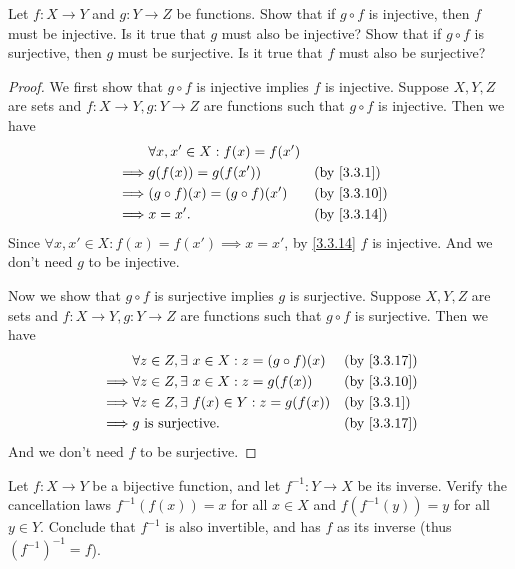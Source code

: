 \begin{ex}\label{ex:3.3.5}
  Let \(f : X \to Y\) and \(g : Y \to Z\) be functions.
  Show that if \(g \circ f\) is injective, then \(f\) must be injective.
  Is it true that \(g\) must also be injective?
  Show that if \(g \circ f\) is surjective, then \(g\) must be surjective.
  Is it true that \(f\) must also be surjective?
\end{ex}

\begin{proof}
  We first show that \(g \circ f\) is injective implies \(f\) is injective.
  Suppose \(X, Y, Z\) are sets and \(f : X \to Y, g : Y \to Z\) are functions such that \(g \circ f\) is injective.
  Then we have
  \begin{align*}
             & \forall x, x' \in X : f(x) = f(x')                                \\
    \implies & g(f(x)) = g(f(x'))                 &  & \by{3.3.1}                \\
    \implies & (g \circ f)(x) = (g \circ f)(x')   &  & \text{(by \cref{3.3.10})} \\
    \implies & x = x'.                            &  & \text{(by \cref{3.3.14})}
  \end{align*}
  Since \(\forall x, x' \in X : f(x) = f(x') \implies x = x'\), by \cref{3.3.14} \(f\) is injective.
  And we don't need \(g\) to be injective.

  Now we show that \(g \circ f\) is surjective implies \(g\) is surjective.
  Suppose \(X, Y, Z\) are sets and \(f : X \to Y, g : Y \to Z\) are functions such that \(g \circ f\) is surjective.
  Then we have
  \begin{align*}
             & \forall z \in Z, \exists\ x \in X : z = (g \circ f)(x) &  & \text{(by \cref{3.3.17})} \\
    \implies & \forall z \in Z, \exists\ x \in X : z = g(f(x))        &  & \text{(by \cref{3.3.10})} \\
    \implies & \forall z \in Z, \exists\ f(x) \in Y : z = g(f(x))     &  & \by{3.3.1}                \\
    \implies & g \text{ is surjective}.                               &  & \text{(by \cref{3.3.17})}
  \end{align*}
  And we don't need \(f\) to be surjective.
\end{proof}

\begin{ex}\label{ex:3.3.6}
  Let \(f : X \to Y\) be a bijective function, and let \(f^{-1} : Y \to X\) be its inverse.
  Verify the cancellation laws \(f^{-1}(f(x)) = x\) for all \(x \in X\) and \(f(f^{-1}(y)) = y\) for all \(y \in Y\).
  Conclude that \(f^{-1}\) is also invertible, and has \(f\) as its inverse (thus \((f^{-1})^{-1} = f\)).
\end{ex}

